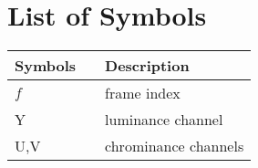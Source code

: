 
\chapter*{List of Symbols}
\pagestyle{plain}

\begin{longtable}[l]{p{}  p{}    p{}}
\hline \hline
\textbf{Symbols}	 & &\textbf{Description} \\
\hline \hline
$f$    & & frame index \\
Y      & & luminance channel \\
U,V    & & chrominance channels \\
\hline \hline
\end{longtable}





